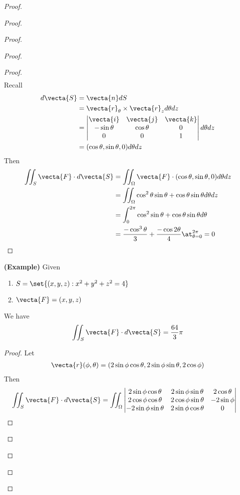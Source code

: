 \documentclass{report}
\begin{document}
\begin{proof}
\begin{proof}
\begin{proof}
\begin{proof}
\begin{proof}
\begin{align*}
\end{align*}
Recall
\begin{align*}
d\vecta{S}&=\vecta{n} dS\\
&=\vecta{r}_\theta \times \vecta{r}_z d\theta dz\\
&=\begin{vmatrix} 
  \vecta{i} & \vecta{j} & \vecta{k}\\
  -\sin \theta & \cos \theta & 0\\
  0 & 0 & 1
\end{vmatrix}d\theta dz\\
&=(\cos \theta, \sin \theta,0)d\theta dz
\end{align*}
Then 
\begin{align*}
\iint_S \vecta{F}\cdot d\vecta{S}&=\iint_\Omega \vecta{F} \cdot (\cos \theta, \sin \theta ,0) d\theta dz \\
&=\iint_{\Omega} \cos^2 \theta \sin \theta +\cos \theta \sin \theta d\theta dz\\
&=\int_{0}^{2\pi} \cos^2 \sin \theta +\cos \theta \sin \theta d\theta \\
&= \frac{-\cos^3 \theta}{3}+\frac{-\cos 2\theta }{4}\at_{\theta=0}^{2\pi}=0
\end{align*}
\end{proof}
\begin{theorem}
\label{10.1.11}
\textbf{(Example)} Given 
\begin{enumerate}[label=(\alph*)]
  \item $S=\set{(x,y,z):x^2+y^2+z^2=4}$ 
  \item $\vecta{F}=(x,y,z)$
\end{enumerate}
We have 
\begin{align*}
\iint_S \vecta{F}\cdot d\vecta{S}=\frac{64}{3}\pi
\end{align*}
\end{theorem}
\begin{proof}
Let 
\begin{align*}
\vecta{r}(\phi,\theta)=(2\sin \phi \cos \theta,2\sin \phi \sin \theta, 2\cos \phi)
\end{align*}
Then 
\begin{align*}
\iint_S \vecta{F}\cdot d\vecta{S}&=\iint_\Omega \begin{vmatrix} 
  2\sin \phi \cos \theta& 2\sin \phi \sin \theta& 2\cos \theta\\
  2\cos \phi \cos \theta & 2\cos \phi \sin \theta & -2\sin \phi\\
  -2\sin \phi \sin \theta & 2\sin \phi \cos \theta &0 

\end{vmatrix}
\end{align*}
\end{proof}
\end{proof}
\end{proof}
\end{proof}
\end{proof}
\end{document}
